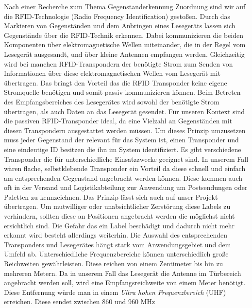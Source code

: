 Nach einer Recherche zum Thema Gegenstanderkennung \bzw Zuordnung sind wir auf
die RFID-Technologie (Radio Frequency Identification) gestoßen. Durch das
Markieren von Gegenständen und dem Anbringen eines Lesegeräts lassen sich
Gegenstände über die RFID-Technik erkennen. Dabei kommunizieren die beiden
Komponenten über elektromagnetische Wellen miteinander, die in der Regel vom
Lesegerät ausgesandt, und über kleine Antennen empfangen werden. Gleichzeitig
wird bei manchen RFID-Transpondern der benötigte Strom zum Senden von
Informationen über diese elektromagnetischen Wellen vom Lesegerät mit
übertragen. Das bringt den Vorteil das die RFID Transponder keine eigene
Stromquelle benötigen und somit passiv kommunizieren können. Beim Betreten des
Empfangsbereiches des Lesegerätes wird sowohl der benötigte Strom übertragen,
als auch Daten an das Lesegerät gesendet. Für unseren Kontext sind die passiven
RFID-Transponder ideal, da eine Vielzahl an Gegenständen mit diesen
Transpondern ausgestattet werden müssen.
Um dieses Prinzip umzusetzen muss jeder Gegenstand der relevant für das System
ist, einen Transponder und eine eindeutige ID besitzen die ihn im System
identifiziert. Es gibt verschiedene Transponder die für unterschiedliche
Einsatzzwecke geeignet sind. In unserem Fall wären flache, selbstklebende
Transponder ein Vorteil da diese schnell und einfach am entsprechenden
Gegenstand angebracht werden können. Diese \citep{[Labels](http://www.identytag.de/rfid-labels-tags/smart-label/?gclid=CjwKCAiA693RBRAwEiwALCc3u1b_V_f_mLZsRZhpNhQOmtAnyH0GOJu_uTyqLHvTeSdN0y6WsmXX0BoCRgkQAvD_BwE)} 
kommen auch oft in der Versand und Logistikabteilung zur Anwendung um
Postsendungen oder Paletten zu kennzeichnen. Das Prinzip lässt sich auch auf
unser Projekt übertragen. Um mutwilliger oder unabsichtlicher Zerstörung diese
Labels zu verhindern, sollten diese an Positionen angebracht werden die
möglichst nicht ersichtlich sind. Die Gefahr das ein Label beschädigt und
dadurch nicht mehr erkannt wird besteht allerdings weiterhin.
Die Auswahl des entsprechenden Transponders und Lesegerätes hängt stark vom
Anwendungsgebiet und dem Umfeld ab. Unterschiedliche Frequenzbereiche können
unterschiedlich große Reichweiten gewährleisten. Diese reichen von einem
Zentimeter bis hin zu mehreren Metern. Da in unserem Fall das Lesegerät \bzw
die Antenne im Türbereich angebracht werden soll, wird eine Empfangsreichweite
von \ca einem Meter benötigt. Diese Entfernung würde man in einem
\textit{Ultra hohen Frequenzbereich} (UHF) erreichen. Diese sendet zwischen 
860 und 960 MHz \citep{[quelle](https://www.impinj.com/about-rfid/types-of-rfid-systems/)}
